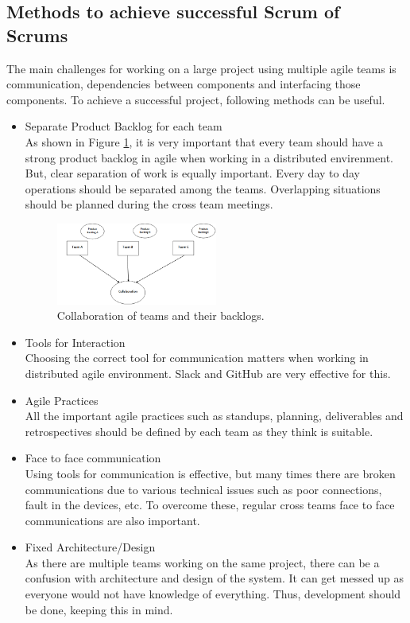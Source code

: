 \documentclass[sigconf]{acmart}
\begin{document}
\subsection{Methods to achieve successful Scrum of Scrums}
The main challenges for working on a large project using multiple agile teams is communication, dependencies between components and interfacing those components. To achieve a successful project, following methods can be useful\cite{SunitP}. 
\begin{itemize}
\item Separate Product Backlog for each team
\\As shown in Figure \ref{fig:PBCollab}, it is very important that every team should have a strong product backlog in agile when working in a distributed envirenment. But, clear separation of work is equally important. Every day to day operations should be separated among the teams. Overlapping situations should be planned during the cross team meetings.
\begin{figure}[H]
  \includegraphics[width=0.5\textwidth]{PBCollab}
  \caption{Collaboration of teams and their backlogs.}
  \label{fig:PBCollab}
\end{figure}

\item Tools for Interaction
\\Choosing the correct tool for communication matters when working in distributed agile environment. Slack and GitHub are very effective for this.

\item Agile Practices
\\All the important agile practices such as standups, planning, deliverables and retrospectives should be defined by each team as they think is suitable.

\item Face to face communication 
\\Using tools for communication is effective, but many times there are broken communications due to various technical issues such as poor connections, fault in the devices, etc. To overcome these, regular cross teams face to face communications are also important.

\item Fixed Architecture/Design
\\As there are multiple teams working on the same project, there can be a confusion with architecture and design of the system. It can get messed up as everyone would not have knowledge of everything. Thus, development should be done, keeping this in mind.
\end{itemize}
\end{document}

